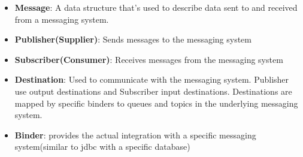 \documentclass[a4paper, 12pt]{article}
\begin{document}
    \begin{itemize}
        \item \textbf{Message}: A data structure that's used to describe data sent to and received from a messaging system.
        \item \textbf{Publisher(Supplier)}: Sends messages to the messaging system
        \item \textbf{Subscriber(Consumer)}: Receives messages from the messaging system
        \item \textbf{Destination}: Used to communicate with the messaging system.
        Publisher use output destinations and Subscriber input destinations.
        Destinations are mapped by specific binders to queues and topics in the underlying messaging system.
        \item \textbf{Binder}: provides the actual integration with a specific messaging system(similar to jdbc with a specific database)
    \end{itemize}
\end{document}
